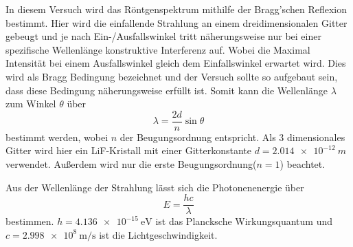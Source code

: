 In diesem Versuch wird das Röntgenspektrum mithilfe der Bragg'schen Reflexion bestimmt.
Hier wird die einfallende Strahlung an einem dreidimensionalen Gitter gebeugt und je nach Ein-/Ausfallswinkel tritt näherungsweise nur bei einer spezifische Wellenlänge konstruktive Interferenz auf. 
Wobei die Maximal Intensität bei einem Ausfallswinkel gleich dem Einfallswinkel erwartet wird.
Dies wird als Bragg Bedingung bezeichnet und der Versuch sollte so aufgebaut sein, dass diese Bedingung näherungsweise erfüllt ist.
Somit kann die Wellenlänge $\lambda$ zum Winkel $\theta$ über
\begin{equation}
    \lambda = \frac{2d}{n}\sin\theta
    \label{eq:bragg}
\end{equation}
bestimmt werden, wobei $n$ der Beugungsordnung entspricht.
Als 3 dimensionales Gitter wird hier ein LiF-Kristall mit einer Gitterkonstante $d=\SI{2.014e-12}{m}$ verwendet.
Außerdem wird nur die erste Beugungsordnung($n=1$) beachtet.

Aus der Wellenlänge der Strahlung lässt sich die Photonenenergie über
\begin{equation}
    E = \frac{hc}{\lambda}
    \label{eq:energie}
\end{equation}
bestimmen. 
$h=\SI{4.136e-15}{\electronvolt}$ ist das Plancksche Wirkungsquantum und $c=\SI{2.998e8}{\metre\per\second}$ ist die Lichtgeschwindigkeit.\cite{physics_constants}